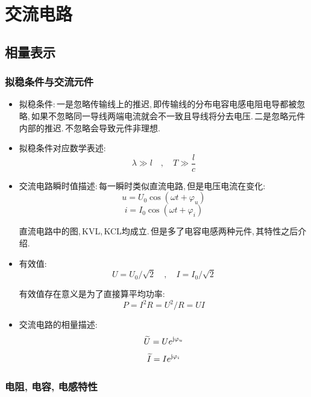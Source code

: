 \chapter{交流电路}


\section{相量表示}

\subsection{拟稳条件与交流元件}

\begin{itemize}
\item 拟稳条件:\,一是忽略传输线上的推迟,\,即传输线的分布电容电感电阻电导都被忽略,\,如果不忽略同一导线两端电流就会不一致且导线将分去电压.\,二是忽略元件内部的推迟.\,不忽略会导致元件非理想.

\item 拟稳条件对应数学表述:
\[\lambda\gg l \quad ,\quad T\gg \frac{l}{c}\]

\item 交流电路瞬时值描述:\,每一瞬时类似直流电路,\,但是电压电流在变化:
\[u=U_0\cos (\omega t+\varphi_u)\]
\[i=I_0\cos (\omega t+\varphi_i)\]

直流电路中的图,\,KVL,\,KCL均成立.\,但是多了电容电感两种元件,\,其特性之后介绍.

\item 有效值:
\[U=U_0/\sqrt{2}\quad ,\quad I=I_0/\sqrt{2}\]

有效值存在意义是为了直接算平均功率:
\[P=I^2R =U^2/R=UI\]

\item 交流电路的相量描述:\,
\[\widetilde{U}=Ue^{{\rm j} \varphi_u}\]
\[\widetilde{I}=Ie^{{\rm j} \varphi_i}\]


\end{itemize}

\subsection{电阻, 电容, 电感特性}


